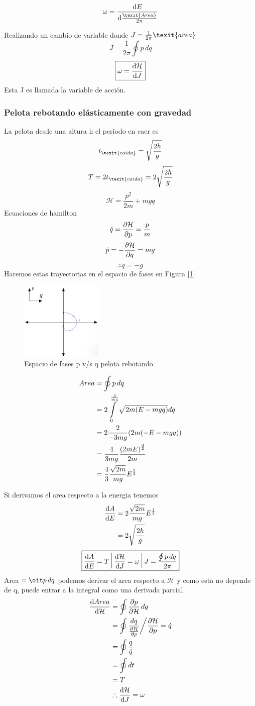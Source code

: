 \documentclass[12pt]{article}
\newcommand{\eq}[1]{\[#1\]}
\newcommand{\en}[1]{\[\boxed{#1}\]}
\newcommand{\sss}[1]{\subsubsection{#1}}
\newcommand{\fgref}[1]{Figura [\ref{#1}]}
\begin{document}
\eq{\omega = \dv{E}{\frac{\texit{Area}}{2\pi}}}

Realizando un cambio de variable donde $J= \frac{1}{2 \pi} \texit{area}$\\
\eq{J= \frac{1}{2 \pi} \oint p \, d q}
\en{\omega = \dv{\mathcal{H}}{J}}
Esta J es llamada la variable de acción.
\sss{Pelota rebotando elásticamente con gravedad} 

La pelota desde una altura h el periodo en caer es 
\eq{t_{\texit{caida}}=\sqrt{\frac{2h}{g}}}
\eq{T=2 t_{\texit{caida}} = 2 \sqrt{\frac{2h}{g}}}
\en{\mathcal{H}= \frac{p^2}{2m} + mgq}
Ecuaciones de hamilton\\
\eq{\dot{q}= \pdv{\mathcal{H}}{p}= \frac{p}{m}}
\eq{\dot{p}= -\pdv{\mathcal{H}}{q}= mg}
\eq{\therefore \ddot{q}= -g}
Haremos estas trayectorias en el espacio de fases en \fgref{grafico_pq_pelota}.

\begin{figure}[h!]
    \centering
    \includegraphics[width=0.35\textwidth]{espaciodefases_pq_pelota.png}
    \caption{Espacio de fases p v/s q pelota rebotando}
    \label{grafico_pq_pelota}
\end{figure}

\begin{align}
Area &=\oint p \, dq\\
&= 2 \int \limits_{0}^{\frac{E}{mg}} \sqrt{2m\qty(E-mgq)}dq\\
&=2 \frac{2}{-3mg} (2m(-E-mgq))\\
&=\frac{4}{3mg}\frac{\qty(2mE)^{\frac{3}{2}}}{2m}\\
&= \frac{4}{3} \frac{\sqrt{2m}}{mg}E^{\frac{3}{2}}
\end{align}

Si derivamos el area respecto a la energia tenemos
\begin{align}
\dv{A}{E}&= 2 	\frac{\sqrt{2m}}{mg}E^{\frac{1}{2}}\\
&= 2 \sqrt{\frac{2h}{g}}
\end{align}
\en{\dv{A}{E}=T \,\,\vline \,\, \dv{\mathcal{H}}{J}= \omega \,\, \vline \,\, J= \frac{\oint p \,dq}{2\pi} }
Area $=\oit p \, dq$ podemos derivar el area respecto a $\mathcal{H}$ y como esta no depende de q, puede entrar a la integral como una derivada parcial.
\begin{align}
	\dv{Area}{\mathcal{H}}&= \oint \pdv{p}{\mathcal{H}} \, dq\\
	&= \oint \frac{dq}{\pdv{\mathcal{H}}{p}}\bigg/ \pdv{\mathcal{H}}{p}= \dot{q}\\
	&=\oint \frac{q}{\dot{q}}\\
	&= \oint dt \\
	&= T\\
	&\therefore \dv{\mathcal{H}}{J}= \omega
\end{align}
 
\end{document}
